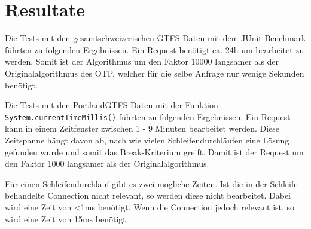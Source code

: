 \section{Resultate}
Die Tests mit den gesamtschweizerischen GTFS-Daten mit dem JUnit-Benchmark führten zu folgenden Ergebnissen. Ein Request benötigt ca. 24h um bearbeitet zu werden. Somit ist der Algorithmus um den Faktor 10000 langsamer als der Originalalgorithmus des OTP, welcher für die selbe Anfrage nur wenige Sekunden benötigt.

Die Tests mit den PortlandGTFS-Daten mit der Funktion \texttt{System.currentTimeMillis()} führten zu folgenden Ergebnissen. Ein Request kann in einem Zeitfenster zwischen 1 - 9 Minuten bearbeitet werden. Diese Zeitspanne hängt davon ab, nach wie vielen Schleifendurchläufen eine Lösung gefunden wurde und somit das Break-Kriterium greift. Damit ist der Request um den Faktor 1000 langsamer als der Originalalgorithmus.

Für einen Schleifendurchlauf gibt es zwei mögliche Zeiten. Ist die in der Schleife behandelte Connection nicht relevant, so werden diese nicht bearbeitet. Dabei wird eine Zeit von <1ms benötigt. Wenn die Connection jedoch relevant ist, so wird eine Zeit von 15ms benötigt.
